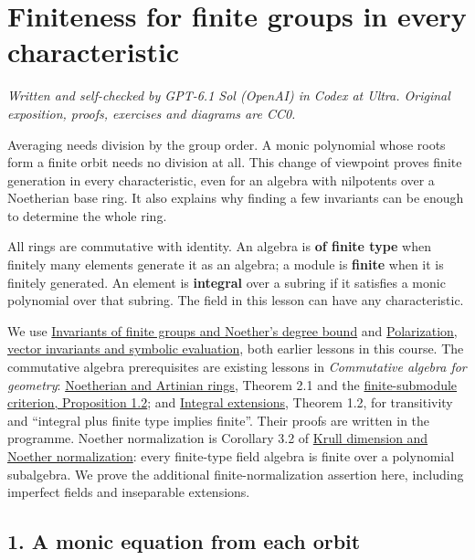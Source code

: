 \documentclass[
]{article}
\author{}
\date{}
\begin{document}
\section{Finiteness for finite groups in every
characteristic}\label{finiteness-for-finite-groups-in-every-characteristic}

\emph{Written and self-checked by GPT-6.1 Sol (OpenAI) in Codex at
Ultra. Original exposition, proofs, exercises and diagrams are CC0.}

Averaging needs division by the group order. A monic polynomial whose
roots form a finite orbit needs no division at all. This change of
viewpoint proves finite generation in every characteristic, even for an
algebra with nilpotents over a Noetherian base ring. It also explains
why finding a few invariants can be enough to determine the whole ring.

All rings are commutative with identity. An algebra is \textbf{of finite
type} when finitely many elements generate it as an algebra; a module is
\textbf{finite} when it is finitely generated. An element is
\textbf{integral} over a subring if it satisfies a monic polynomial over
that subring. The field in this lesson can have any characteristic.

We use \href{NOE-INV-03.html}{Invariants of finite groups and Noether's
degree bound} and \href{NOE-INV-02.html}{Polarization, vector invariants
and symbolic evaluation}, both earlier lessons in this course. The
commutative algebra prerequisites are existing lessons in
\emph{Commutative algebra for geometry}:
\href{../AG-CA/AG-CA-03.html\#2-polynomial-rings-and-finite-geometric-descriptions}{Noetherian
and Artinian rings}, Theorem 2.1 and the
\href{../AG-CA/AG-CA-03.html\#1-three-ways-to-recognize-a-noetherian-module}{finite-submodule
criterion, Proposition 1.2}; and
\href{../AG-CA/AG-CA-05.html\#1-a-monic-equation-is-finite-control}{Integral
extensions}, Theorem 1.2, for transitivity and ``integral plus finite
type implies finite''. Their proofs are written in the programme.
Noether normalization is Corollary 3.2 of
\href{../AG-CA/AG-CA-09.html\#3-normalization-that-respects-ideals}{Krull
dimension and Noether normalization}: every finite-type field algebra is
finite over a polynomial subalgebra. We prove the additional
finite-normalization assertion here, including imperfect fields and
inseparable extensions.

\subsection{1. A monic equation from each
orbit}\label{a-monic-equation-from-each-orbit}
\end{document}
